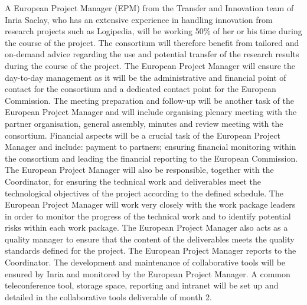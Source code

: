 \begin{workpackage}[id=management,type=MGT,wphases=1-48,
  short=Management,
  title=Management,
  lead=Inr,InrRM=34,InnRM=2,SacRM=2,TumRM=2,LieRM=2,BelRM=2,DelRM=2,FauRM=2]
\begin{tasklist}
  \begin{task}[id=admin,title=Administrative and Financial Management,shorttitle=Adm.\&Fin.,lead=Inr,InrRM=20,wphases=1-48]
    A European Project Manager (EPM) from the Transfer and Innovation
    team of Inria Saclay, who has an extensive experience in handling
    innovation from research projects such as Logipedia, will be working
    50\% of her or his time during the course of the project.
     The
    consortium will therefore benefit from tailored and on-demand
    advice regarding the use and potential transfer of the research
    results during the course of the project.  The European Project Manager will ensure the
    day-to-day management as it will be the administrative and
    financial point of contact for the consortium and a dedicated
    contact point for the European Commission. The meeting preparation
    and follow-up will be another task of the European Project Manager and will include
    organising plenary meeting with the partner organisation, general
    assembly, minutes and review meeting with the consortium. Financial
    aspects will be a crucial task of the European Project Manager and include: payment to
    partners; ensuring financial monitoring within the consortium and
    leading the financial reporting to the European Commission.  The
    European Project Manager will also be responsible, together with the 
    Coordinator, for ensuring the technical work and deliverables meet
    the technological objectives of the project according to the
    defined schedule. The European Project Manager will work very closely with the work
    package leaders in order to monitor the progress of the technical
    work and to identify potential risks within each work package.
    The European Project Manager also
    acts as a quality manager to ensure that the content of the
    deliverables meets the quality standards defined for the
    project. The European Project Manager reports to the Coordinator.  The
    development and maintenance of collaborative tools will be ensured
    by Inria and monitored by the European Project Manager. A common teleconference tool,
    storage space, reporting and intranet will be set up and detailed
    in the collaborative tools deliverable of month 2.
  \end{task}


\end{tasklist}
\end{workpackage}
